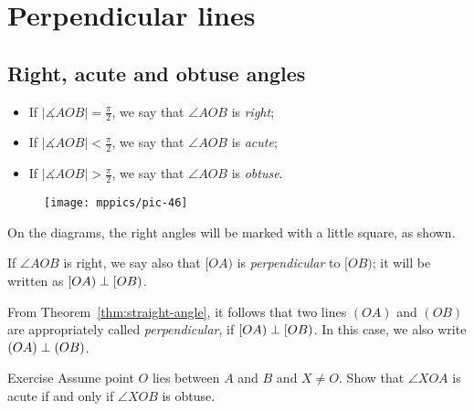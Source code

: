 \chapter{Perpendicular lines}\label{chap:perp}

\section*{Right, acute and obtuse angles}

\begin{itemize}
\item If $|\measuredangle A O B|=\tfrac\pi2$, we say that $\angle A O B$ is \emph{right};
\item If $|\measuredangle A O B|<\tfrac\pi2$, we say that $\angle A O B$ is 
\emph{acute};
\item If $|\measuredangle A O B|>\tfrac\pi2$, we say that $\angle A O B$ is \emph{obtuse}.
\end{itemize}

\begin{wrapfigure}[2]{r}{25mm}
\vskip-25mm
\centering
\texttt{[image: mppics/pic-46]}
\end{wrapfigure}

On the diagrams,
the right angles will be marked with a little square, 
as shown.

If $\angle A O B$ is right,
we say also
that $[O A)$ is \emph{perpendicular} to $[O B)$; 
it will be written as $[O A)\z\perp [O B)$.

From Theorem~\ref{thm:straight-angle}, 
it follows that two lines $(O A)$
 and $(O B)$ are appropriately called {}\emph{perpendicular}, if $[O A)\z\perp [O B)$.
In this case, we also write $(O A)\z\perp (O B)$.



\begin{thm}{Exercise}\label{ex:acute-obtuce}
Assume point $O$ lies between $A$ and $B$ and $X\ne O$.
Show that 
$\angle XOA$ is acute if and only if 
$\angle XOB$ is obtuse.
\end{thm}



